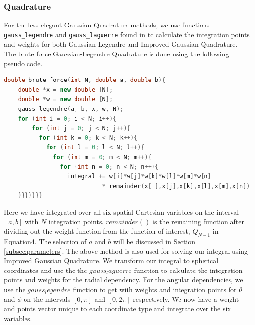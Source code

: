 \documentclass{emulateapj}
\begin{document}
\subsubsection{Quadrature}
For the less elegant Gaussian Quadrature methods, we use functions \texttt{gauss\_legendre} and \texttt{gauss\_laguerre} found in \cite{codeex} to calculate the integration points and weights for both Gaussian-Legendre and Improved Gaussian Quadrature. The brute force Gaussian-Legendre Quadrature is done using the following pseudo code.
\begin{lstlisting}[language=c++]
double brute_force(int N, double a, double b){
    double *x = new double [N];
    double *w = new double [N];
    gauss_legendre(a, b, x, w, N);
    for (int i = 0; i < N; i++){
        for (int j = 0; j < N; j++){
          for (int k = 0; k < N; k++){
            for (int l = 0; l < N; l++){
              for (int m = 0; m < N; m++){
                for (int n = 0; n < N; n++){
                  integral += w[i]*w[j]*w[k]*w[l]*w[m]*w[n]
                            * remainder(x[i],x[j],x[k],x[l],x[m],x[n]);
    }}}}}}}
\end{lstlisting}
Here we have integrated over all six spatial Cartesian variables on the interval $[a,b]$ with $N$ integration points. $remainder()$ is the remaining function after dividing out the weight function from the function of interest, $Q_{N-1}$ in Equation4. The selection of $a$ and $b$ will be discussed in Section \ref{subsec:parameters}. The above method is also used for solving our integral using Improved Gaussian Quadrature. We transform our integral to spherical coordinates and use the  the $gauss_laguerre$ function to calculate the integration points and weights for the radial dependency. For the angular dependencies, we use the $gauss_legendre$ function to get with weights and integration points for $\theta$ and $\phi$ on the intervals $[0,\pi]$ and $[0,2\pi]$ respectively. We now have a weight and points vector unique to each coordinate type and integrate over the six variables.
\end{document}
